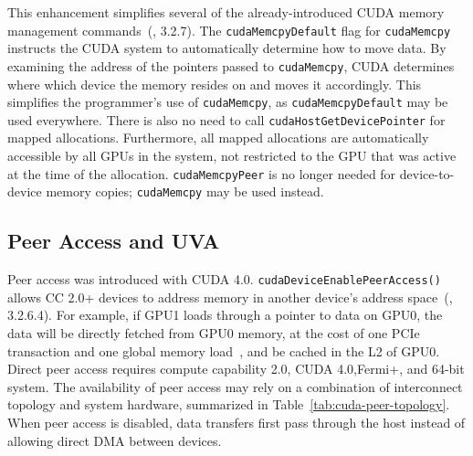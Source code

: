 This enhancement simplifies several of the already-introduced CUDA memory management commands~(\cite{nvidia2011cudac40}, 3.2.7).
The \texttt{cudaMemcpyDefault} flag for \texttt{cudaMemcpy} instructs the CUDA system to automatically determine how to move data.
By examining the address of the pointers passed to \texttt{cudaMemcpy}, CUDA determines where which device the memory resides on and moves it accordingly.
This simplifies the programmer's use of \texttt{cudaMemcpy}, as \texttt{cudaMemcpyDefault} may be used everywhere.
There is also no need to call \texttt{cudaHostGetDevicePointer} for mapped allocations.
Furthermore, all mapped allocations are automatically accessible by all GPUs in the system, not restricted to the GPU that was active at the time of the allocation.
\texttt{cudaMemcpyPeer} is no longer needed for device-to-device memory copies; \texttt{cudaMemcpy} may be used instead.

\subsection{Peer Access and UVA}
\label{sec:cuda-peer}



Peer access was introduced with CUDA 4.0.
\texttt{cudaDeviceEnablePeerAccess()} allows CC 2.0+ devices to address memory in another device's address space~(\cite{nvidia2011cudac40}, 3.2.6.4).
For example, if GPU1 loads through a pointer to data on GPU0, the data will be directly fetched from GPU0 memory, at the cost of one PCIe transaction and one global memory load~\cite{schroeder2011peer}, and be cached in the L2 of GPU0.
Direct peer access requires compute capability 2.0, CUDA 4.0,Fermi+, and 64-bit system.
The availability of peer access may rely on a combination of interconnect topology and system hardware, summarized in Table~\ref{tab:cuda-peer-topology}.
When peer access is disabled, data transfers first pass through the host instead of allowing direct DMA between devices.

